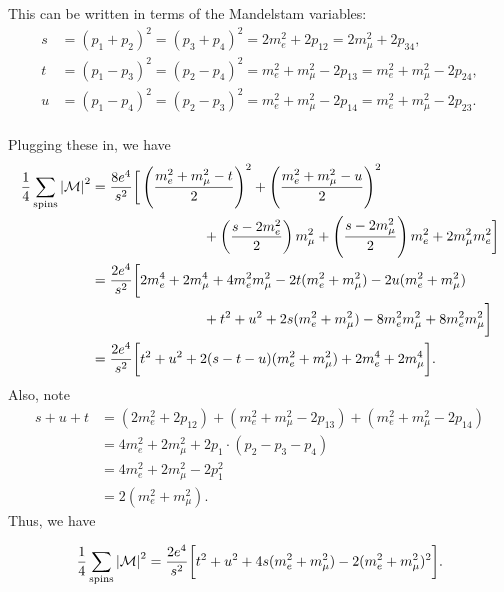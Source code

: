 \documentclass[11pt]{article}
\theoremstyle{definition}
\begin{document}
This can be written in terms of the Mandelstam variables:
\begin{equation}
    \begin{aligned}
        s &= (p_{1} + p_{2})^{2} = (p_{3} + p_{4})^{2} = 2m_{e}^{2} + 2p_{12} = 2m_{\mu}^{2} + 2p_{34}, \\
        t &= (p_{1} - p_{3})^{2} = (p_{2} - p_{4})^{2} = m_{e}^{2} + m_{\mu}^{2} - 2p_{13} = m_{e}^{2} + m_{\mu}^{2} - 2p_{24}, \\
        u &= (p_{1} - p_{4})^{2} = (p_{2} - p_{3})^{2} = m_{e}^{2} + m_{\mu}^{2} - 2p_{14} = m_{e}^{2} + m_{\mu}^{2} - 2p_{23}. \\
    \end{aligned}   
\end{equation}

Plugging these in, we have
\begin{equation}
    \begin{aligned}
        \frac{1}{4}\sum_\text{spins}\abs{\mathcal{M}}^2 &= \frac{8e^4}{s^2}\bigg[ \left(\frac{m_e^2+m_\mu^2-t}{2}\right)^2 + \left(\frac{m_e^2+m_\mu^2-u}{2}\right)^2 \\
        &\qquad \qquad \qquad \qquad+ \left(\frac{s-2m_e^2}{2}\right)m_\mu^2 + \left(\frac{s-2m_\mu^2}{2}\right)m_e^2 + 2m_\mu^2m_e^2\bigg] \\
        &= \frac{2e^4}{s^2}\bigg[ 2m_e^4 + 2m_\mu^4 + 4m_e^2m_\mu^2 -2t(m_e^2+m_\mu^2) -2u(m_e^2+m_\mu^2) \\
        &\qquad \qquad \qquad \qquad+ t^2 + u^2 + 2s(m_e^2 + m_\mu^2) -8m_e^2m_\mu^2 + 8m_e^2m_\mu^2 \bigg] \\
        &= \frac{2e^4}{s^2}\bigg[ t^2 + u^2 + 2(s-t-u)(m_e^2+m_\mu^2) + 2m_e^4 + 2m_\mu^4 \bigg].
    \end{aligned}
\end{equation}
Also, note
\begin{equation}
    \begin{aligned}
        s+u+t &= (2m_{e}^{2} + 2p_{12}) + (m_{e}^{2} + m_{\mu}^{2} - 2p_{13}) +( m_{e}^{2} + m_{\mu}^{2} - 2p_{14}) \\
        &= 4m_e^2 + 2m_\mu^2 + 2p_1 \cdot (p_2-p_3-p_4) \\
        &= 4m_e^2 + 2m_\mu^2 - 2p_1^2 \\
        &= 2(m_e^2+m_\mu^2).
    \end{aligned}
\end{equation}
Thus, we have
\begin{shaded}
    \begin{equation}
        \frac{1}{4}\sum_\text{spins}\abs{\mathcal{M}}^2 = \frac{2e^4}{s^2}\bigg[ t^2 + u^2 + 4s(m_e^2+m_\mu^2) - 2(m_e^2+m_\mu^2)^2\bigg].
        \label{EQ. M eemm2}
    \end{equation}
\end{shaded}
\end{document}
